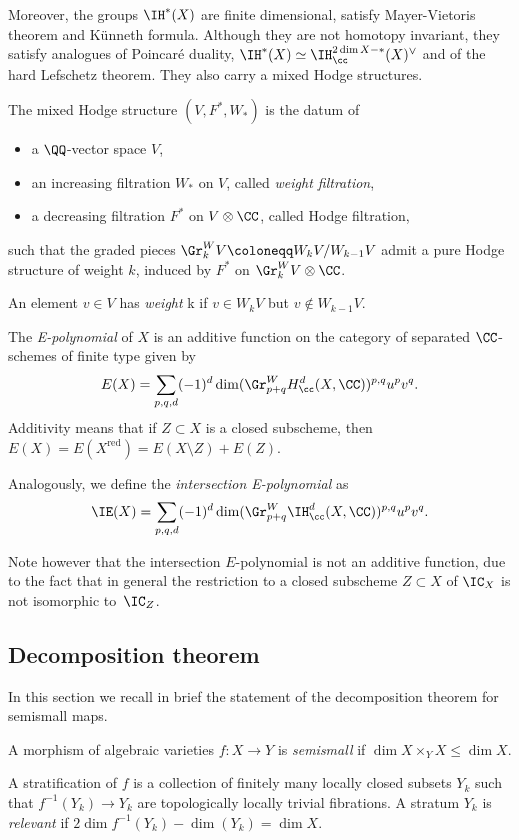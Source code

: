 Moreover, the groups $\IH^*(X)$ are finite dimensional, satisfy Mayer-Vietoris theorem and Künneth formula. Although they are not homotopy invariant, they satisfy analogues of Poincaré duality, \ie $\IH^*(X) \simeq \IH^{2\dim X -*}_{\cc}(X)^{\vee}$ and of the hard Lefschetz theorem.
They also carry a mixed Hodge structures.

\begin{defn} The mixed Hodge structure $(V, F^{*}, W_*)$ is the datum of
\begin{itemize}
\item a $\QQ$-vector space $V$,
		\item an increasing filtration $W_{*}$ on $V$, called \emph{weight filtration},
		\item a decreasing filtration $F^{*}$ on $V \otimes \CC$, called Hodge filtration,
	\end{itemize}
such that the graded pieces $\Gr_k^W V \coloneqq W_kV/W_{k-1}V$ admit a pure Hodge structure of weight $k$, induced by $F^{*}$ on $\Gr_k^W V \otimes \CC$.

An element $v \in V$ has \emph{weight} k if $v \in W_kV$ but $v \not\in W_{k-1}V$.
\end{defn}

\begin{defn}[E-polynomial] The \emph{E-polynomial} of $X$ is an additive function on the category of separated $\CC$-schemes of finite type given by
\[
E(X) = \sum_{p,q,d}(-1)^d \dim ( \Gr^W_{p+q} H^d_{\cc}(X, \CC))^{p,q} u^pv^q.
\]
Additivity means that if $Z \subset X$ is a closed subscheme, then $E(X)=E(X^{\mathrm{red}})=E(X \setminus Z)+ E(Z)$.

Analogously, we define the \emph{intersection E-polynomial} as
\[
\IE(X) = \sum_{p,q,d}(-1)^d \dim ( \Gr^W_{p+q} \IH^d_{\cc}(X, \CC))^{p,q} u^pv^q.
\]
\end{defn}

Note however that the intersection $E$-polynomial is not an additive function, due to the fact that in general the restriction to a closed subscheme $Z\subset X$ of $\IC_X$ is not isomorphic to~$\IC_Z$.

\subsection{Decomposition theorem}
In this section we recall in brief the statement of the decomposition theorem for semismall maps.
\begin{defn}
A morphism of algebraic varieties $f\colon X \to Y$ is \emph{semismall} if $\dim X \times_Y X \leq \dim X$.
\end{defn}
A stratification of $f$ is a collection of finitely many locally closed subsets $Y_k$ such that $f^{-1}(Y_k) \to Y_k$ are topologically locally trivial fibrations. A stratum $Y_k$ is \emph{relevant} if $2 \dim f^{-1}(Y_k) - \dim(Y_k)=\dim X$.

